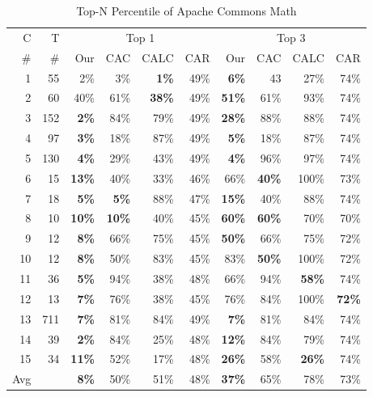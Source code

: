 



\begin{table}
\scriptsize
	\centering
	\caption{Top-N Percentile of Apache Commons Math}
	\label{tab:math}	
	
	\begin{tabular}{r|r||r|r|r|r||r|r|r|r}
	\hline
C &T & \multicolumn{4}{c||}{Top 1} & \multicolumn{4}{c}{Top 3} 
\\  \cline{3-10}
\#  & \#   & Our & CAC & CALC & CAR &  Our & CAC & CALC & CAR\\\hline
	1 & 55 & 2\% & 3\%& \textbf{1\%} & 49\% & \textbf{6\%} & 43 & 27\%& 74\%\\
	2 & 60     & 40\%& 61\%& \textbf{38\%} & 49\% & \textbf{51\%} & 61\% & 93\% & 74\%\\
	3 & 152     & \textbf{2\%} & 84\%& 79\%& 49\%  & \textbf{28\%} & 88\% & 88\% & 74\% \\
	4 & 97      & \textbf{3\%} & 18\%& 87\% &  49\%  & \textbf{5\%} & 18\% & 87\% & 74\% \\
	5 & 130    & \textbf{4\%} & 29\% & 43\% & 49\% & \textbf{4\%} & 96\% & 97\% & 74\%  \\
	6 & 15     & \textbf{13\%} & 40\%& 33\%&46\% & 66\% & \textbf{40\%} & 100\% &  73\% \\
	7 & 18      & \textbf{5\%} & \textbf{5\%} & 88\% & 47\% & \textbf{15\%} & 40\% & 88\% & 74\%\\
	8 & 10     & \textbf{10\%} & \textbf{10\%} & 40\% &45\%  & \textbf{60\%} & \textbf{60\%} & 70\%& 70\%\\
	9 & 12     & \textbf{8\%} & 66\%&75\% & 45\% & \textbf{50\%} &66\% & 75\%& 72\%\\
	10 & 12      & \textbf{8\%} & 50\% & 83\% & 45\% & 83\% & \textbf{50\%} & 100\% & 72\% \\
	11 & 36      & \textbf{5\%} & 94\%& 38\% & 48\% & 66\% & 94\%& \textbf{58\%} & 74\%\\
	12 & 13     & \textbf{7\%} & 76\% & 38\%& 45\% & 76\% & 84\%& 100\%& \textbf{72\%} \\
	
	13 & 711    & \textbf{7\%} & 81\%& 84\% & 49\% & \textbf{7\%} & 81\%& 84\%& 74\% \\
	14 & 39      & \textbf{2\%} & 84\%& 25\%& 48\% & \textbf{12\%} & 84\% & 79\% & 74\% \\
	15 & 34      & \textbf{11\%} & 52\% & 17\% & 48\% & \textbf{26\%} & 58\%& \textbf{26\%} & 74\%\\ \hline
	Avg      &   & \textbf{8\%} & 50\% & 51\% & 48\%  & \textbf{37\%} & 65\% & 78\% & 73\% \\  \hline
	\end{tabular}
\end{table} 

